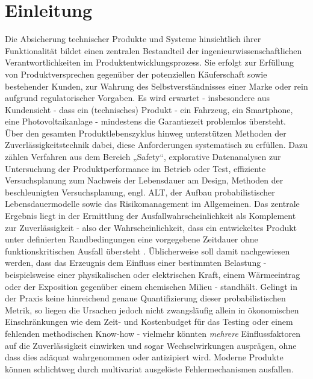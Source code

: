 
\chapter{Einleitung}
Die Absicherung technischer Produkte und Systeme hinsichtlich ihrer Funktionalität bildet einen zentralen Bestandteil der ingenieurwissenschaftlichen Verantwortlichkeiten im Produktentwicklungsprozess.
Sie erfolgt zur Erfüllung von Produktversprechen gegenüber der potenziellen Käuferschaft sowie bestehender Kunden, zur Wahrung des Selbstverständnisses einer Marke oder rein aufgrund regulatorischer Vorgaben.
Es wird erwartet - insbesondere aus Kundensicht - dass ein (technisches) Produkt - ein Fahrzeug, ein Smartphone, eine Photovoltaikanlage - mindestens die Garantiezeit problemlos übersteht.\\
Über den gesamten Produktlebenszyklus hinweg unterstützen Methoden der Zuverlässigkeitstechnik dabei, diese Anforderungen systematisch zu erfüllen.
Dazu zählen Verfahren aus dem Bereich „Safety“, explorative Datenanalysen zur Untersuchung der Produktperformance im Betrieb oder Test, effiziente Versuchsplanung zum Nachweis der Lebensdauer am Design, Methoden der beschleunigten Versuchsplanung, engl. \ac{ALT}, der Aufbau probabilistischer Lebensdauermodelle sowie das Risikomanagement im Allgemeinen.
Das zentrale Ergebnis liegt in der Ermittlung der Ausfallwahrscheinlichkeit als Komplement zur Zuverlässigkeit - also der Wahrscheinlichkeit, dass ein entwickeltes Produkt unter definierten Randbedingungen eine vorgegebene Zeitdauer ohne funktionskritischen Ausfall übersteht \cite{Bertsche.2022}.
Üblicherweise soll damit nachgewiesen werden, dass das Erzeugnis dem Einfluss einer bestimmten Belastung - beispielsweise einer physikalischen oder elektrischen Kraft, einem Wärmeeintrag oder der Exposition gegenüber einem chemischen Milieu - standhält.
Gelingt in der Praxis keine hinreichend genaue Quantifizierung dieser probabilistischen Metrik, so liegen die Ursachen jedoch nicht zwangsläufig allein in ökonomischen Einschränkungen wie dem Zeit- und Kostenbudget für das Testing oder einem fehlenden methodischen Know-how - vielmehr könnten  \textit{mehrere} Einflussfaktoren auf die Zuverlässigkeit einwirken und sogar Wechselwirkungen ausprägen, ohne dass dies adäquat wahrgenommen oder antizipiert wird.
Moderne Produkte können schlichtweg durch multivariat ausgelöste Fehlermechanismen ausfallen.

